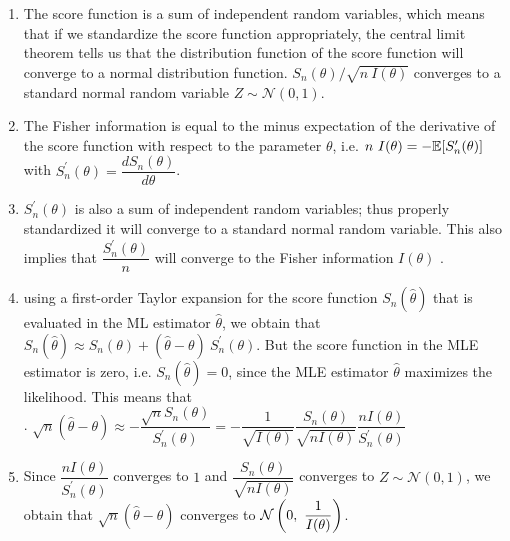 \begin{enumerate}
    \item The score function is a sum of independent random variables, which means that if we standardize the score function appropriately, the central limit theorem tells us that the distribution function of the score function will converge to a normal distribution function.
    $S_n (\theta)/\sqrt{n\ I (\theta)}$ converges to a standard normal random variable $Z \sim \mathcal{N} (0, 1)$.
    \hfill \cite{statistics/book/Statistics-for-Data-Scientists/Maurits-Kaptein}

    \item The Fisher information is equal to the minus expectation of the derivative of the score function with respect to the parameter $\theta$, i.e. $n\ I (\theta) = -\mathbb{E}[S^\prime_n (\theta)]$ with $S^\prime_n (\theta) = \dfrac{dS_n (\theta)}{d\theta}$.
    \hfill \cite{statistics/book/Statistics-for-Data-Scientists/Maurits-Kaptein}

    \item $S^\prime_n (\theta)$ is also a sum of independent random variables; thus properly standardized it will converge to a standard normal random variable.
    This also implies that $\dfrac{S^\prime _n (\theta)}{n}$ will converge to the Fisher information $I (\theta)$ .
    \hfill \cite{statistics/book/Statistics-for-Data-Scientists/Maurits-Kaptein}

    \item using a first-order Taylor expansion for the score function $S_n ( \hat{\theta})$ that is evaluated in the ML estimator $\hat{\theta}$, we obtain that $S_n ( \hat{\theta}) \approx S_n (\theta) + ( \hat{\theta} - \theta)\ S^\prime_n (\theta)$.
    But the score function in the MLE estimator is zero, i.e. $S_n ( \hat{\theta}) = 0$, since the MLE estimator $\hat{\theta}$ maximizes the likelihood. This means that
    \hfill \cite{statistics/book/Statistics-for-Data-Scientists/Maurits-Kaptein}
    \\[0.2cm]
    .\hfill
    $
        \sqrt{n}( \hat{\theta} - \theta)
        \approx - \dfrac{\sqrt{n}S_n (\theta)}{ S^\prime_n (\theta) }
        = - \dfrac{1 }{\sqrt{I (\theta)}} \dfrac{S_n (\theta)}{\sqrt{n I (\theta)}} \dfrac{n I (\theta)}{S^\prime_n (\theta)}
    $
    \hfill \cite{statistics/book/Statistics-for-Data-Scientists/Maurits-Kaptein}

    \item Since $\dfrac{n I (\theta)}{S^\prime _n (\theta)}$ converges to $1$ and $\dfrac{S_n (\theta)}{\sqrt{n I (\theta)}}$ converges to $Z \sim \mathcal{N} (0, 1)$, we obtain that $\sqrt{n}( \hat{\theta} - \theta)$ converges to $\mathcal{N} \dParenBrac{0,\ \dfrac{1}{I (\theta)}}$.
    \hfill \cite{statistics/book/Statistics-for-Data-Scientists/Maurits-Kaptein}


\end{enumerate}
